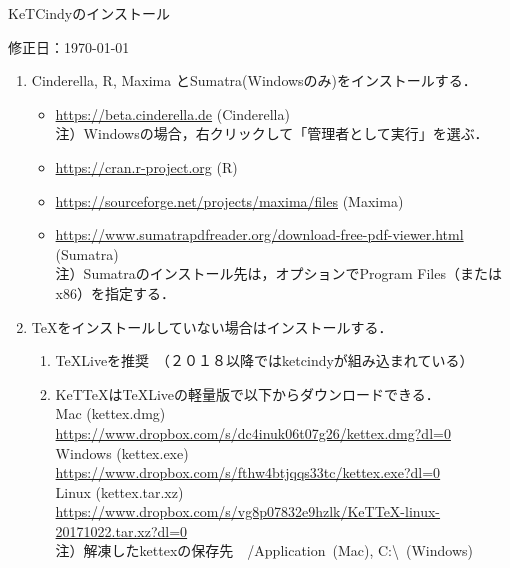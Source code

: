 \documentclass{ujarticle}
\begin{document}
\begin{center}
KeTCindyのインストール
\end{center}

\vspace{-5mm}

\hfill 修正日：\today

\begin{enumerate}[\bf\large 1.]
\item Cinderella, R, Maxima とSumatra(Windowsのみ)をインストールする．\vspace{-2mm}

 \begin{itemize}
 \item \url{https://beta.cinderella.de}  (Cinderella)\\
\hspace*{6mm}注）Windowsの場合，右クリックして「管理者として実行」を選ぶ．
 \item \url{https://cran.r-project.org}   (R)
 \item \url{https://sourceforge.net/projects/maxima/files}  (Maxima)
 \item \url{https://www.sumatrapdfreader.org/download-free-pdf-viewer.html} (Sumatra)\\
\hspace*{6mm}注）Sumatraのインストール先は，オプションでProgram Files（またはx86）を指定する．

 \end{itemize}
\item TeXをインストールしていない場合はインストールする．\vspace{-2mm}
 \begin{enumerate}[(1)]
 \item TeXLiveを推奨　（２０１８以降ではketcindyが組み込まれている）
 \item KeTTeXはTeXLiveの軽量版で以下からダウンロードできる．\\
    \hspace*{5mm}Mac (kettex.dmg)\\
    \hspace*{10mm}\url{https://www.dropbox.com/s/dc4inuk06t07g26/kettex.dmg?dl=0}\\
    \hspace*{5mm}Windows (kettex.exe)\\
    \hspace*{10mm}\url{https://www.dropbox.com/s/fthw4btjqqs33tc/kettex.exe?dl=0}\\
    \hspace*{5mm}Linux (kettex.tar.xz)\\
    \hspace*{10mm}\url{https://www.dropbox.com/s/vg8p07832e9hzlk/KeTTeX-linux-20171022.tar.xz?dl=0}\\
    \hspace*{5mm}注）解凍したkettexの保存先　/Application\ (Mac), C:\textbackslash\ (Windows)
\end{enumerate}
 

\end{enumerate}
\end{document}
